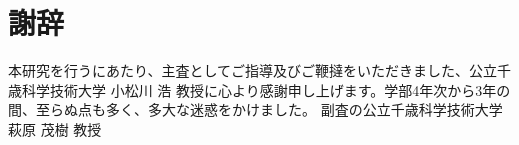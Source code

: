 \chapter*{謝辞}

本研究を行うにあたり、主査としてご指導及びご鞭撻をいただきました、公立千歳科学技術大学 小松川 浩 教授に心より感謝申し上げます。学部4年次から3年の間、至らぬ点も多く、多大な迷惑をかけました。%
副査の公立千歳科学技術大学 萩原 茂樹 教授